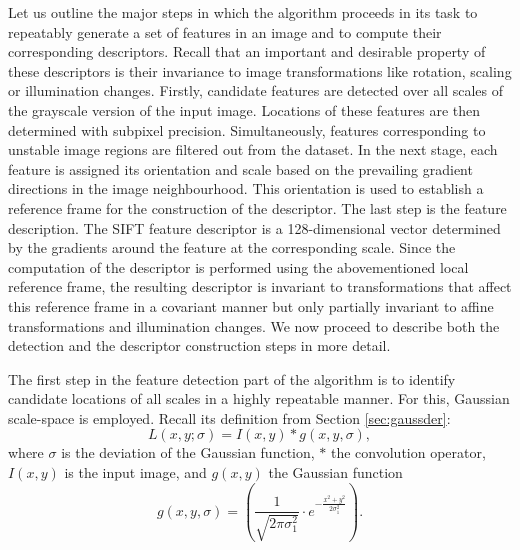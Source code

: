 Let us outline the major steps in which the algorithm proceeds in its task to repeatably generate a set of features in an image and to compute their corresponding descriptors. 
Recall that an important and desirable property of these descriptors is their invariance to image transformations like rotation, scaling or illumination changes. 
Firstly, candidate features are detected over all scales of the grayscale version of the input image. 
Locations of these features are then determined with subpixel precision. 
Simultaneously, features corresponding to unstable image regions are filtered out from the dataset. 
In the next stage, each feature is assigned its orientation and scale based on the prevailing gradient directions in the image neighbourhood. 
This orientation is used to establish a reference frame for the construction of the descriptor.
The last step is the feature description.
The SIFT feature descriptor is a 128-dimensional vector determined by the gradients around the feature at the corresponding scale. 
Since the computation of the descriptor is performed using the abovementioned local reference frame, 
the resulting descriptor is invariant to transformations that affect this reference frame in a covariant manner but only partially invariant to affine transformations and illumination changes.
We now proceed to describe both the detection and the descriptor construction steps in more detail.

The first step in the feature detection part of the algorithm is to identify candidate locations of all scales in a highly repeatable manner. 
For this, Gaussian scale-space is employed. 
Recall its definition from Section \ref{sec:gaussder}:
\[
L(x, y; \sigma) =  I(x, y) * g(x, y, \sigma),
\]
where $\sigma$ is the deviation of the Gaussian function, $*$ the convolution operator, $I(x, y)$ is the input image, and $g(x, y)$ the Gaussian function
\[
 g(x, y, \sigma) = \left( \frac{1}{\sqrt{2\pi \sigma _1^{2}}} \cdot e^{-\frac{x^{2}+y^{2}}{2\sigma_1^{2}} } \right).
\]

